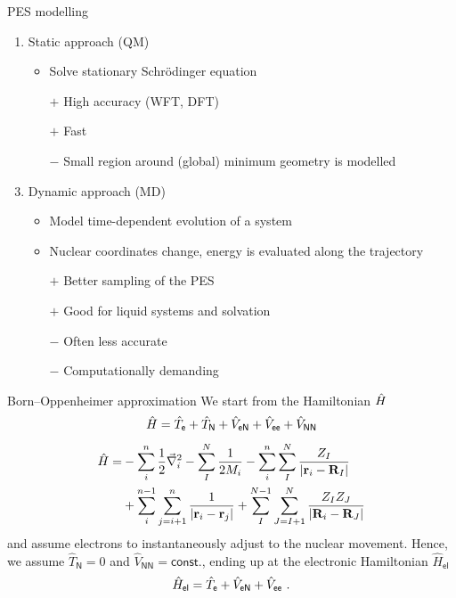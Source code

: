 \documentclass[t]{beamer}
\begin{document}
\begin{frame}{PES modelling}
	\begin{enumerate}
		\item Static approach (QM)
		      \begin{itemize}
			      \item Solve stationary Schrödinger equation
			      \item[$+$] High accuracy (WFT, DFT)
			      \item[$+$] Fast
			      \item[$-$] Small region around (global) minimum geometry is modelled
		      \end{itemize}
		\item[]
		      \pause
		\item Dynamic approach (MD)
		      \begin{itemize}
			      \item Model time-dependent evolution of a system
			      \item Nuclear coordinates change, energy is evaluated along the trajectory
			      \item[$+$] Better sampling of the PES
			      \item[$+$] Good for liquid systems and solvation
			      \item[$-$] Often less accurate
			      \item[$-$] Computationally demanding
		      \end{itemize}
	\end{enumerate}
\end{frame}
\begin{frame}{Born--Oppenheimer approximation}
	We start from the Hamiltonian $\Hat{H}$ \pause
	\begin{equation*}
		\Hat{H} = \Hat{T}_\mathsf{e} + \Hat{T}_\mathsf{N} + \Hat{V}_\mathsf{eN} + \Hat{V}_\mathsf{ee} + \Hat{V}_\mathsf{NN}
	\end{equation*}
	\pause
	\vspace{-1cm}
	\begin{align*}
		\Hat{H} = & - \sum_i^n \frac{1}{2} \vec{\nabla}_i^2 - \sum_I^N \frac{1}{2M_i} - \sum_i^n \sum_I^N \frac{Z_I}{\left| \mathbf{r}_i-\mathbf{R}_I \right|}                              \\
		          & + \sum_i^{n-1} \sum_{j=i+1}^n \frac{1}{\left| \mathbf{r}_i-\mathbf{r}_j \right|} + \sum_I^{N-1} \sum_{J=I+1}^N \frac{Z_I Z_J}{\left| \mathbf{R}_i-\mathbf{R}_J \right|}
	\end{align*}
	and assume electrons to instantaneously adjust to the nuclear movement. Hence, we assume $\hat{T}_\mathsf{N}=0$ and $\hat{V}_\mathsf{NN}=\mathsf{const.}$, ending up at the electronic Hamiltonian $\hat{H}_\mathsf{el}$ \pause
	\begin{equation*}
		\hat{H}_\mathsf{el} = \Hat{T}_\mathsf{e} + \Hat{V}_\mathsf{eN} + \Hat{V}_\mathsf{ee}~.
	\end{equation*}
\end{frame}
\end{document}

